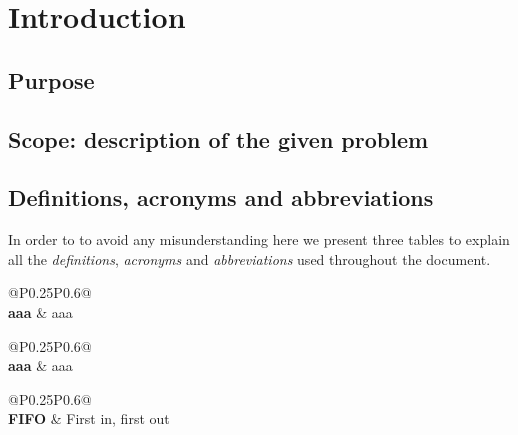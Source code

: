 \section{Introduction}
\label{sect:introduction}

\subsection{Purpose}
\label{subsect:purpose}

\subsection{Scope: description of the given problem}
\label{subsect:scope}

\subsection{Definitions, acronyms and abbreviations}
\label{subsect:definitionsacronymsabbreviations}

In order to to avoid any misunderstanding here we present three tables to explain all the \textit{definitions}, \textit{acronyms} and \textit{abbreviations} used throughout the document.

\begin{table}[h!]
    \centering
    \begin{tabular}{@{}P{0.25\textwidth}P{0.6\textwidth}@{}}
        \\
        \toprule
        \textbf{aaa} & aaa\\
    \end{tabular}
\caption{Definitions}
\label{table:definitions}
\end{table}

\begin{table}[h!]
    \centering
    \begin{tabular}{@{}P{0.25\textwidth}P{0.6\textwidth}@{}}        
        \\
        \toprule
        \textbf{aaa} & aaa\\
    \end{tabular}
\caption{Abbreviations}
\label{table:abbreviations}
\end{table}

\begin{table}[h!]
    \centering
    \begin{tabular}{@{}P{0.25\textwidth}P{0.6\textwidth}@{}}
        \\
        \toprule
        \textbf{FIFO} & First in, first out\\
    \end{tabular}
\caption{Acronyms}
\label{table:acronyms}
\end{table}
